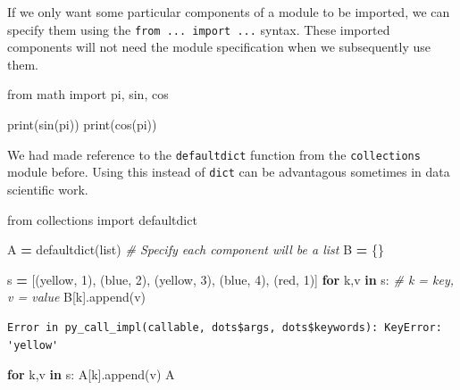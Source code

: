 \documentclass[
  letterpaper,
]{scrbook}
\newenvironment{Shaded}{\begin{snugshade}}{\end{snugshade}}
\newcommand{\BuiltInTok}[1]{#1}
\newcommand{\CommentTok}[1]{\textcolor[rgb]{0.56,0.35,0.01}{\textit{#1}}}
\newcommand{\ControlFlowTok}[1]{\textcolor[rgb]{0.13,0.29,0.53}{\textbf{#1}}}
\newcommand{\DecValTok}[1]{\textcolor[rgb]{0.00,0.00,0.81}{#1}}
\newcommand{\ImportTok}[1]{#1}
\newcommand{\KeywordTok}[1]{\textcolor[rgb]{0.13,0.29,0.53}{\textbf{#1}}}
\newcommand{\NormalTok}[1]{#1}
\newcommand{\OperatorTok}[1]{\textcolor[rgb]{0.81,0.36,0.00}{\textbf{#1}}}
\newcommand{\StringTok}[1]{\textcolor[rgb]{0.31,0.60,0.02}{#1}}
\begin{document}
If we only want some particular components of a module to be imported, we can specify them using the \texttt{from\ ...\ import\ ...} syntax. These imported components will not need the module specification when we subsequently use them.

\begin{Shaded}
\begin{Highlighting}[]
\ImportTok{from}\NormalTok{ math }\ImportTok{import}\NormalTok{ pi, sin, cos}

\BuiltInTok{print}\NormalTok{(sin(pi))}
\BuiltInTok{print}\NormalTok{(cos(pi))}
\end{Highlighting}
\end{Shaded}

We had made reference to the \texttt{defaultdict} function from the \texttt{collections} module before. Using this instead of \texttt{dict} can be advantagous sometimes in data scientific work.

\begin{Shaded}
\begin{Highlighting}[]
\ImportTok{from}\NormalTok{ collections }\ImportTok{import}\NormalTok{ defaultdict}

\NormalTok{A }\OperatorTok{=}\NormalTok{ defaultdict(}\BuiltInTok{list}\NormalTok{) }\CommentTok{\# Specify each component will be a list}
\NormalTok{B }\OperatorTok{=}\NormalTok{ \{\}}

\NormalTok{s }\OperatorTok{=}\NormalTok{ [(}\StringTok{\textquotesingle{}yellow\textquotesingle{}}\NormalTok{, }\DecValTok{1}\NormalTok{), (}\StringTok{\textquotesingle{}blue\textquotesingle{}}\NormalTok{, }\DecValTok{2}\NormalTok{), (}\StringTok{\textquotesingle{}yellow\textquotesingle{}}\NormalTok{, }\DecValTok{3}\NormalTok{), (}\StringTok{\textquotesingle{}blue\textquotesingle{}}\NormalTok{, }\DecValTok{4}\NormalTok{), (}\StringTok{\textquotesingle{}red\textquotesingle{}}\NormalTok{, }\DecValTok{1}\NormalTok{)]}
\ControlFlowTok{for}\NormalTok{ k,v }\KeywordTok{in}\NormalTok{ s: }\CommentTok{\# k = key, v = value}
\NormalTok{    B[k].append(v)}
\end{Highlighting}
\end{Shaded}

\begin{verbatim}
Error in py_call_impl(callable, dots$args, dots$keywords): KeyError: 'yellow'
\end{verbatim}

\begin{Shaded}
\begin{Highlighting}[]
\ControlFlowTok{for}\NormalTok{ k,v }\KeywordTok{in}\NormalTok{ s:}
\NormalTok{    A[k].append(v)}
\NormalTok{A}
\end{Highlighting}
\end{Shaded}
\end{document}
